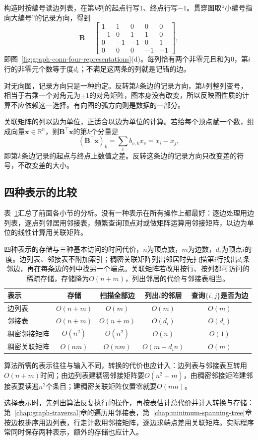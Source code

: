 构造时按编号读边列表，在第$k$列的起点行写$1$、终点行写$-1$。贯穿图取“小编号指向大编号”的记录方向，得到
\begin{equation}
\bm B=
\begin{bmatrix}
1&1&0&0&0\\
-1&0&1&1&0\\
0&-1&-1&0&1\\
0&0&0&-1&-1
\end{bmatrix},
\label{eq:graph-conn-running-incidence}
\end{equation}
即图~\ref{fig:graph-conn-four-representations}(d)。每列恰有两个非零元且和为$0$，第$i$行的非零元个数等于度$d_i$；不满足这两条的列就是记错的边。

对无向图，记录方向只是一种约定。反转第$k$条边的记录方向，第$k$列整列变号，相当于右乘一个对角元为$\pm1$的对角矩阵，图本身没有改变，所以反映图性质的计算不应依赖这一选择。有向图的弧方向则是数据的一部分。

关联矩阵的列以边为单位，正适合以边为单位的计算。若给每个顶点赋一个数，组成向量$\bm x\in\mathbb R^n$，则$\bm B^{\top}\bm x$的第$k$个分量是
\[
(\bm B^{\top}\bm x)_k=\sum_v b_{v,k}x_v=x_i-x_j,
\]
即第$k$条边记录的起点与终点上数值之差。反转这条边的记录方向只改变差的符号，不改变差的大小。

\subsection{四种表示的比较}
\label{sec:graph-conn-representation-comparison}

表~\ref{tab:graph-conn-representation-costs}汇总了前面各小节的分析。没有一种表示在所有操作上都最好：逐边处理用边列表，逐点列邻居用邻接表，频繁查询顶点对或做矩阵运算用邻接矩阵，以边为单位的线性计算用关联矩阵。

\begin{table}[!htb]
  \centering\small
  \begin{tabular}{@{}lcccc@{}}
    \toprule
    表示 & 存储 & 扫描全部边 & 列出$i$的邻居 & 查询$\{i,j\}$是否为边\\
    \midrule
    边列表 & $O(n+m)$ & $O(m)$ & $O(m)$ & $O(m)$\\
    邻接表 & $O(n+m)$ & $O(n+m)$ & $O(d_i)$ & $O(d_i)$\\
    稠密邻接矩阵 & $O(n^2)$ & $O(n^2)$ & $O(n)$ & $O(1)$\\
    稠密关联矩阵 & $O(nm)$ & $O(nm)$ & $O(m+d_in)$ & $O(m)$\\
    \bottomrule
  \end{tabular}
  \caption{四种表示的存储与三种基本访问的时间代价，$n$为顶点数，$m$为边数，$d_i$为顶点$i$的度。边列表、邻接表不附加索引；稠密关联矩阵列出邻居时先扫描第$i$行找出$d_i$条邻边，再在每条边的列中找另一个端点。关联矩阵若改用按行、按列都可访问的稀疏存储，存储降为$O(n+m)$，列出邻居的代价与邻接表相当。}
  \label{tab:graph-conn-representation-costs}
\end{table}

算法所需的表示往往与输入不同，转换的代价也应计入：边列表与邻接表互转用$O(n+m)$时间；由边列表建稠密邻接矩阵要$O(n^2+m)$，由稠密邻接矩阵建邻接表要读遍$n^2$个条目；建稠密关联矩阵仅置零就要$O(nm)$。

选择表示时，先列出算法反复执行的操作，再按表估计总代价并计入转换与存储：第~\ref{chap:graph-traversal}章的遍历用邻接表，第~\ref{chap:minimum-spanning-tree}章按边权排序用边列表，行走计数用邻接矩阵，逐边求端点差用关联矩阵。实际程序常同时保存两种表示，额外的存储也应计入。
